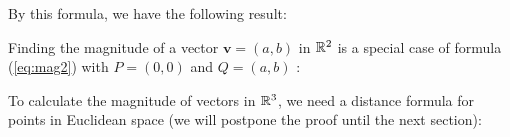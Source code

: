 By this formula, we have the following result:

\medskip
{}

Finding the magnitude of a vector $\textbf{v} = (a,b)$ in $\mathbb{R}^{2}$ is a
special case of formula (\ref{eq:mag2}) with $P = (0,0)$ and $Q = (a,b)$ :

\medskip
{}
\smallskip

To calculate the magnitude of vectors in $\mathbb{R}^{3}$, we need a distance formula for points in Euclidean
space (we will postpone the proof until the next section):


